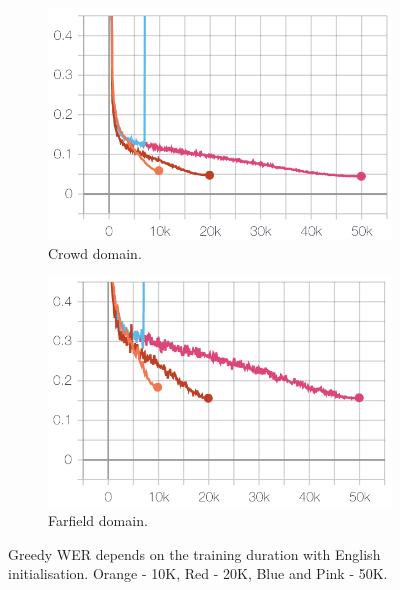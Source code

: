 \documentclass[a4paper]{article}
\begin{document}
\begin{figure}[ht]
\begin{subfigure}{.49\linewidth}
  \centering
  \includegraphics[width=1.\linewidth]{LaTeX/img/crowd.png}  
  \caption{Crowd domain.}
  \label{fig:wer_steps1}
\end{subfigure}
\begin{subfigure}{.49\linewidth}
  \centering
  \includegraphics[width=1.\linewidth]{LaTeX/img/farfield.png}  
  \caption{Farfield domain.}
  \label{fig:wer_steps2}
\end{subfigure}
\caption{Greedy WER depends on the training duration with English initialisation. Orange - 10K, Red - 20K, Blue and Pink - 50K. }
\label{fig:wer_steps}
\end{figure}
\end{document}
